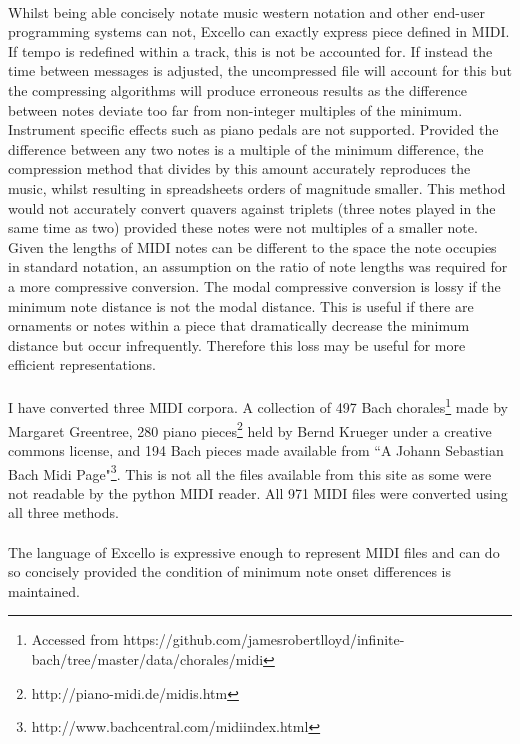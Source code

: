 \paragraph{} Whilst being able concisely notate music western notation and other end-user programming systems can not, Excello can exactly express piece defined in MIDI. If tempo is redefined within a track, this is not be accounted for. If instead the time between messages is adjusted, the uncompressed file will account for this but the compressing algorithms will produce erroneous results as the difference between notes deviate too far from non-integer multiples of the minimum. Instrument specific effects such as piano pedals are not supported. Provided the difference between any two notes is a multiple of the minimum difference, the compression method that divides by this amount accurately reproduces the music, whilst resulting in spreadsheets orders of magnitude smaller. This method would not accurately convert quavers against triplets (three notes played in the same time as two) provided these notes were not multiples of a smaller note. Given the lengths of MIDI notes can be different to the space the note occupies in standard notation, an assumption on the ratio of note lengths was required for a more compressive conversion. The modal compressive conversion is lossy if the minimum note distance is not the modal distance. This is useful if there are ornaments or notes within a piece that dramatically decrease the minimum distance but occur infrequently. Therefore this loss may be useful for more efficient representations.

\paragraph{} I have converted three MIDI corpora. A collection of 497 Bach chorales\footnote{Accessed from https://github.com/jamesrobertlloyd/infinite-bach/tree/master/data/chorales/midi} made by Margaret Greentree, 280 piano pieces\footnote{http://piano-midi.de/midis.htm} held by Bernd Krueger under a creative commons license, and 194 Bach pieces made available from ``A Johann Sebastian Bach Midi Page"\footnote{http://www.bachcentral.com/midiindex.html}. This is not all the files available from this site as some were not readable by the python MIDI reader. All 971 MIDI files were converted using all three methods.

\paragraph{} The language of Excello is expressive enough to represent MIDI files and can do so concisely provided the condition of minimum note onset differences is maintained.

